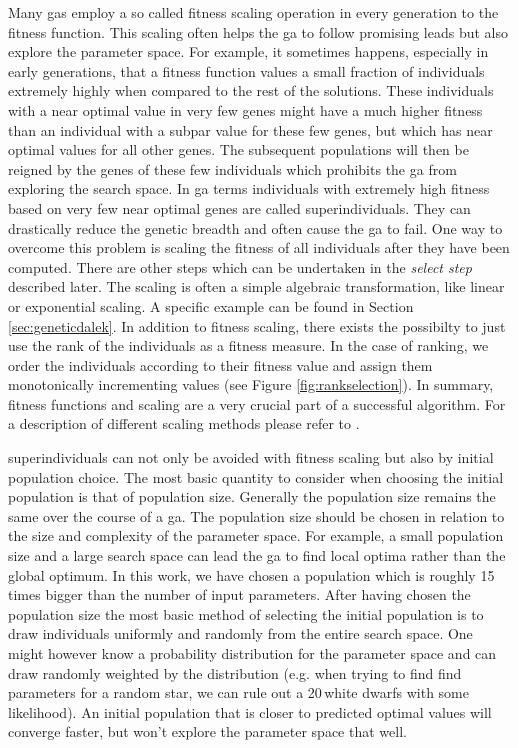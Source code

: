 Many \glspl{ga} employ a so called \gls{fitness} scaling operation in every generation to the \gls{fitness} function. This scaling often helps the \gls{ga} to follow promising leads but also explore the parameter space. For example, it sometimes happens, especially in early generations, that a \gls{fitness} function values a small fraction of individuals extremely highly when compared to the rest of the solutions. These \glspl{individual} with a near optimal value in very few \glspl{gene} might have a much higher \gls{fitness} than an \gls{individual} with a subpar value for these few \glspl{gene}, but which has near optimal values for all other \glspl{gene}. The subsequent populations will then be reigned by the \glspl{gene} of these few individuals which prohibits the \gls{ga} from exploring the search space. In \gls{ga} terms individuals with extremely high fitness based on very few near optimal \glspl{gene} are called \glspl{superindividual}. They can drastically reduce the genetic breadth and often cause the \gls{ga} to fail. One way to overcome this problem is scaling the fitness of all individuals after they have been computed. There are other steps which can be undertaken in the \textit{select step} described later. The scaling is often a simple algebraic transformation, like linear or exponential scaling. A specific example can be found in Section \ref{sec:geneticdalek}. In addition to fitness scaling, there exists the possibilty to just use the rank of the individuals as a \gls{fitness} measure. In the case of ranking, we order the \glspl{individual} according to their \gls{fitness} value and assign them monotonically incrementing values (see Figure \ref{fig:rankselection}). In summary, fitness functions and scaling are a very crucial part of a successful algorithm. For a description of different scaling methods please refer to \citet{Kreinovich93geneticalgorithms}.

\Glspl{superindividual} can not only be avoided with \gls{fitness} scaling but also by initial population choice. The most basic quantity to consider when choosing the initial population is that of population size. Generally the population size remains the same over the course of a \gls{ga}. The population size should be chosen in relation to the size and complexity of the parameter space. For example, a small population size and a large search space can lead the \gls{ga} to find local optima rather than the global optimum. In this work, we have chosen a population which is roughly 15 times bigger than the number of input parameters. After having chosen the population size the most basic method of selecting the initial population is to draw individuals uniformly and randomly from the entire search space. One might however know a probability distribution for the parameter space and can draw randomly weighted by the distribution (e.g. when trying to find find parameters for a random star, we can rule out a 20\,\msun white dwarfs with some likelihood). An initial population that is closer to predicted optimal values will converge faster, but won't explore the parameter space that well. 

